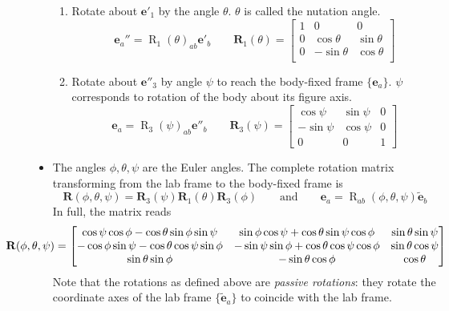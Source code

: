 \documentclass[11pt, a4paper]{article}
\newcommand{\eqtext}[1]{\qquad \text{#1} \qquad}
\newcommand{\e}{\bm{e}} %
\begin{document}
\begin{itemize}
\begin{enumerate}
		\item Rotate about $ \e'_{1} $ by the angle $ \theta $. $ \theta $ is called the nutation angle.
		\[
			\e_{a}'' = \operatorname{R}_{1}(\theta)_{ab} \e'_{b} \qquad \mathbf{R}_{1} (\theta) = 
			\begin{bmatrix}
				1 & 0 & 0\\
				0 & \cos \theta & \sin \theta\\
				0 & - \sin \theta & \cos \theta\\
			\end{bmatrix}
		\]

		\item Rotate about $ \e''_{3} $ by angle $ \psi $ to reach the body-fixed frame $ \{\e_{a} \} $. $ \psi $ corresponds to rotation of the body about its figure axis.
		\[
			\e_{a} = \operatorname{R}_{3}(\psi)_{ab} \e''_{b} \qquad \mathbf{R}_{3} (\psi) = 
			\begin{bmatrix}
				\cos \psi & \sin \psi & 0\\
				- \sin \psi & \cos \psi & 0\\
				0 & 0 & 1
			\end{bmatrix}
		\]
	\end{enumerate}
	
	\item The angles $ \phi, \theta, \psi $ are the Euler angles. The complete rotation matrix transforming from the lab frame to the body-fixed frame is
	\begin{equation*}
		\mathbf{R}(\phi, \theta, \psi) = \mathbf{R}_{3}(\psi) \mathbf{R}_{1} (\theta) \mathbf{R}_{3}(\phi) \eqtext{and} \e_{a} = \operatorname{R}_{ab}(\phi, \theta, \psi) \tilde{\e}_{b}
	\end{equation*}
	In full, the matrix reads
	\[
		\hspace{-15mm}\mathbf{R}(\phi, \theta, \psi) =
		\begin{bmatrix}
			\cos \psi \cos \phi - \cos \theta \sin \phi \sin \psi & \sin \phi \cos \psi + \cos \theta \sin \psi \cos \phi & \sin \theta \sin \psi\\
			- \cos \phi \sin \psi - \cos \theta \cos \psi \sin \phi & - \sin \psi \sin \phi + \cos \theta \cos \psi \cos \phi & \sin \theta \cos \psi \\
			\sin \theta \sin \phi & - \sin \theta \cos \phi & \cos \theta
		\end{bmatrix}
	\]
	Note that the rotations as defined above are \textit{passive rotations}: they rotate the coordinate axes of the lab frame $ \{\tilde{\e}_{a} \} $ to coincide with the lab frame. 
	

\end{itemize}
\end{document}
